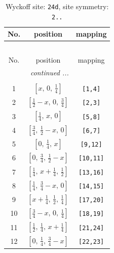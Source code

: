 \documentclass[fleqn,8pt]{jsarticle}
\begin{document}
\begin{longtable}{ccc}
\caption{Wyckoff site: {\tt 24d}, site symmetry: {\tt 2..}}
 \\
 \hline \hline
No. & position & mapping \\ \hline \endfirsthead

\multicolumn{2}{l}{\tablename\ \thetable{}} \\
 \hline \hline
No. & position & mapping \\ \hline \endhead

 \hline \hline
\multicolumn{2}{r}{\footnotesize\it continued ...} \\ \endfoot

 \hline \hline
\multicolumn{2}{r}{} \\ \endlastfoot

1 & $\left[ x,\, 0,\, \frac{1}{4} \right]$ & {\tt [1,4]} \\ \hline
2 & $\left[ \frac{1}{2} - x,\, 0,\, \frac{3}{4} \right]$ & {\tt [2,3]} \\ \hline
3 & $\left[ \frac{1}{4},\, x,\, 0 \right]$ & {\tt [5,8]} \\ \hline
4 & $\left[ \frac{3}{4},\, \frac{1}{2} - x,\, 0 \right]$ & {\tt [6,7]} \\ \hline
5 & $\left[ 0,\, \frac{1}{4},\, x \right]$ & {\tt [9,12]} \\ \hline
6 & $\left[ 0,\, \frac{3}{4},\, \frac{1}{2} - x \right]$ & {\tt [10,11]} \\ \hline
7 & $\left[ \frac{1}{4},\, x + \frac{1}{4},\, \frac{1}{2} \right]$ & {\tt [13,16]} \\ \hline
8 & $\left[ \frac{1}{4},\, \frac{3}{4} - x,\, 0 \right]$ & {\tt [14,15]} \\ \hline
9 & $\left[ x + \frac{1}{4},\, \frac{1}{2},\, \frac{1}{4} \right]$ & {\tt [17,20]} \\ \hline
10 & $\left[ \frac{3}{4} - x,\, 0,\, \frac{1}{4} \right]$ & {\tt [18,19]} \\ \hline
11 & $\left[ \frac{1}{2},\, \frac{1}{4},\, x + \frac{1}{4} \right]$ & {\tt [21,24]} \\ \hline
12 & $\left[ 0,\, \frac{1}{4},\, \frac{3}{4} - x \right]$ & {\tt [22,23]} \\
\end{longtable}
\renewcommand{\arraystretch}{1.2}
\end{document}
